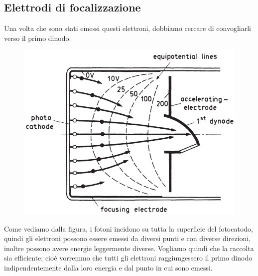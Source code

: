 \subsection{Elettrodi di focalizzazione}
Una volta che sono stati emessi questi elettroni, dobbiamo cercare di convogliarli verso il primo dinodo.

\vspace{-0.3cm}

\begin{minipage}{0.39\textwidth}
   \begin{figure}[H]
      \centering
      \includegraphics[width=\textwidth]{immagini/elettrodo_di_focalizzazione.png}
   \end{figure}
\end{minipage}
\begin{minipage}{0.6\textwidth}
   \vspace{0.8cm}Come vediamo dalla figura, i fotoni incidono su tutta la superficie del fotocatodo, quindi gli elettroni possono essere emessi da diversi punti e con diverse direzioni, inoltre possono avere energie leggermente diverse. Vogliamo quindi che la raccolta sia efficiente, cioè vorremmo che tutti gli elettroni raggiungessero il primo dinodo indipendentemente dalla loro energia e dal punto in cui sono emessi.
\end{minipage}

